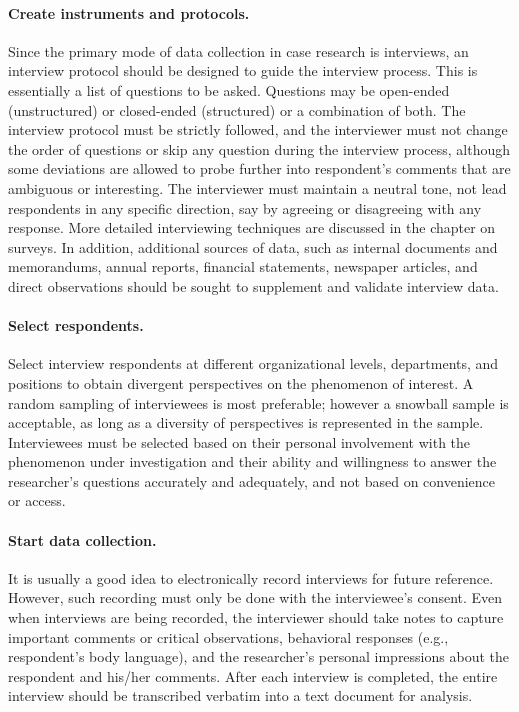 \paragraph{Create instruments and protocols.} Since the primary mode of data collection in case research is interviews, an interview protocol should be designed to guide the interview process. This is essentially a list of questions to be asked. Questions may be open-ended (unstructured) or closed-ended (structured) or a combination of both. The interview protocol must be strictly followed, and the interviewer must not change the order of questions or skip any question during the interview process, although some deviations are allowed to probe further into respondent’s comments that are ambiguous or interesting. The interviewer must maintain a neutral tone, not lead respondents in any specific direction, say by agreeing or disagreeing with any response. More detailed interviewing techniques are discussed in the chapter on surveys. In addition, additional sources of data, such as internal documents and memorandums, annual reports, financial statements, newspaper articles, and direct observations should be sought to supplement and validate interview data.

\paragraph{Select respondents.} Select interview respondents at different organizational levels, departments, and positions to obtain divergent perspectives on the phenomenon of interest. A random sampling of interviewees is most preferable; however a snowball sample is acceptable, as long as a diversity of perspectives is represented in the sample. Interviewees must be selected based on their personal involvement with the phenomenon under investigation and their ability and willingness to answer the researcher’s questions accurately and adequately, and not based on convenience or access.

\paragraph{Start data collection.} It is usually a good idea to electronically record interviews for future reference. However, such recording must only be done with the interviewee’s consent. Even when interviews are being recorded, the interviewer should take notes to capture important comments or critical observations, behavioral responses (e.g., respondent’s body language), and the researcher’s personal impressions about the respondent and his/her comments. After each interview is completed, the entire interview should be transcribed verbatim into a text document for analysis.

